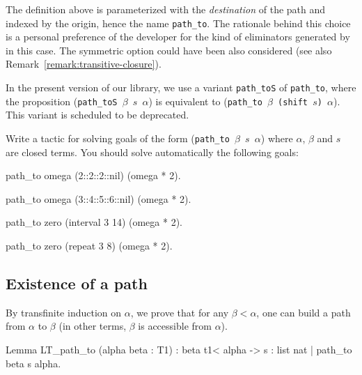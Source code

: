 \documentclass[a4paper]{book}
\begin{document}
\begin{remark}
The definition above is parameterized with the \emph{destination} of the path and indexed by the origin, hence the name \texttt{path\_to}. The rationale behind this choice is a personal preference of the developer  for the kind of eliminators generated by \coq{} in this case. The symmetric option could have been also considered (see also Remark~\vref{remark:transitive-closure}).
\end{remark}



\begin{remark}
In the present version of our library, we use a variant \texttt{path\_toS} of
\texttt{path\_to}, where the proposition
(\texttt{path\_toS $\beta$ $s$ $\alpha$}) is equivalent to
(\texttt{path\_to $\beta$ (shift $s$) $\alpha$}). This variant is scheduled to be deprecated.
\end{remark}


\begin{exercise}
Write a tactic for solving goals of the form (\texttt{path\_to $\beta$ $s$ $\alpha$})
where $\alpha$, $\beta$ and $s$ are closed terms. 
You should solve automatically the following goals:

\begin{Coqsrc}
 path_to omega (2::2::2::nil) (omega * 2).

 path_to omega (3::4::5::6::nil) (omega * 2).

 path_to zero (interval 3 14) (omega * 2).

 path_to zero (repeat 3 8) (omega * 2).
\end{Coqsrc}

\end{exercise}



\subsection{Existence of a path}


By transfinite induction on $\alpha$, we prove that for any $\beta<\alpha$, 
one can build a path from $\alpha$ to $\beta$ (in other terms, $\beta$ is accessible from $\alpha$).

\begin{Coqsrc}
Lemma LT_path_to (alpha beta : T1) :
  beta t1< alpha -> {s : list nat | path_to beta s alpha}.
\end{Coqsrc}
\end{document}
